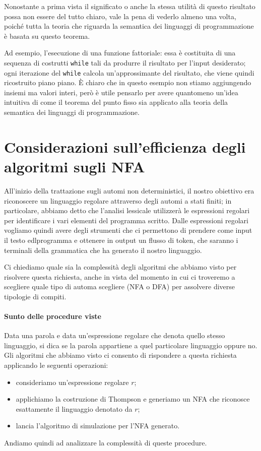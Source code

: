 \documentclass[class=book, crop=false, oneside, 12pt]{standalone}
\begin{document}
Nonostante a prima vista il significato o anche la stessa utilità di questo risultato possa non essere del tutto chiaro, vale la pena di vederlo almeno una volta, poiché tutta la teoria che riguarda la semantica dei linguaggi di programmazione è basata su questo teorema. 

Ad esempio, l'esecuzione di una funzione fattoriale: essa è costituita di una sequenza di costrutti \texttt{while} tali da produrre il risultato per l'input desiderato; ogni iterazione del \texttt{while} calcola un'approssimante del risultato, che viene quindi ricostruito piano piano. È chiaro che in questo esempio non stiamo aggiungendo insiemi ma valori interi, però è utile pensarlo per avere quantomeno un'idea intuitiva di come il teorema del punto fisso sia applicato alla teoria della semantica dei linguaggi di programmazione.

\section{Considerazioni sull'efficienza degli algoritmi sugli NFA}
All'inizio della trattazione sugli automi non deterministici, il nostro obiettivo era riconoscere un linguaggio regolare attraverso degli automi a stati finiti; in particolare, abbiamo detto che l'analisi lessicale utilizzerà le espressioni regolari per identificare i vari elementi del programma scritto. Dalle espressioni regolari vogliamo quindi avere degli strumenti che ci permettono di prendere come input il testo edlprogramma e ottenere in output un flusso di token, che saranno i terminali della grammatica che ha generato il nostro linguaggio.

Ci chiediamo quale sia la complessità degli algoritmi che abbiamo visto per risolvere questa richiesta, anche in vista del momento in cui ci troveremo a scegliere quale tipo di automa scegliere (NFA o DFA) per assolvere diverse tipologie di compiti.

\paragraph{Sunto delle procedure viste}
Data una parola e data un'espressione regolare che denota quello stesso linguaggio, si dica se la parola appartiene a quel particolare linguaggio oppure no. Gli algoritmi che abbiamo visto ci consento di rispondere a questa richiesta applicando le seguenti operazioni:
\begin{itemize}
    \item consideriamo un'espressione regolare \(r\);
    \item applichiamo la costruzione di Thompson e generiamo un NFA che riconosce esattamente il linguaggio denotato da \(r\);
    \item lancia l'algoritmo di simulazione per l'NFA generato.
\end{itemize}
Andiamo quindi ad analizzare la complessità di queste procedure.
\end{document}
